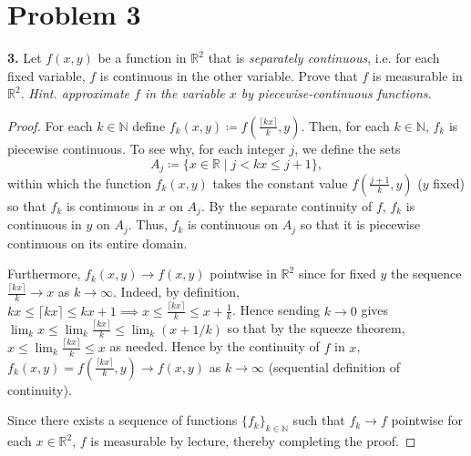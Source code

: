 \section*{Problem 3}
\noindent \textbf{3.} Let \( f(x,y) \) be a function in \( \mathbb{R}^{2}  \) that is \emph{separately continuous}, i.e. for each fixed variable, \( f \) is continuous in the other variable. Prove that \( f \) is measurable in \( \mathbb{R}^{2}  \). \emph{Hint. approximate \( f \) in the variable \( x \) by piecewise-continuous functions.}
\begin{proof}
For each \( k \in \mathbb{N}  \) define \( f_k(x,y) \coloneqq f\left(\frac{\lceil kx \rceil}{k}, y \right)\). Then, for each \( k \in \mathbb{N} \), \( f_k \) is piecewise continuous. To see why, for each integer \( j \), we define the sets
\[ A_j \coloneqq \{ x \in \mathbb{R} \mid j < kx \leq j+1 \}, \]
within which the function \( f_k(x,y) \) takes the constant value \( f\left(\frac{j+1}{k}, y\right) \) (\( y \) fixed) so that \( f_k \) is continuous in \( x \) on \( A_j \). By the separate continuity of \( f \), \( f_k \) is continuous in \( y \) on \( A_j \). Thus, \( f _k\) is continuous on \( A_j \) so that it is piecewise continuous on its entire domain.

	Furthermore, \( f_k(x,y) \to f(x,y) \) pointwise in \( \mathbb{R}^{2}  \) since for fixed \( y \) the sequence \(\frac{\lceil kx \rceil}{k} \to x\) as \( k \to \infty\). Indeed, by definition, \( kx \leq \lceil kx \rceil \leq kx + 1 \implies x \leq \frac{\lceil kx \rceil}{k} \leq x + \frac{1}{k}  \). Hence sending \( k \to 0 \) gives \( \lim_k x \leq  \lim_k\frac{\lceil kx \rceil}{k} \leq \lim_k (x+1/k) \) so that by the squeeze theorem, \( x\leq \lim_k  \frac{\lceil kx \rceil}{k} \leq x \) as needed. Hence by the continuity of \( f \) in \( x \), \( f_k(x,y) = f\left(\frac{\lceil kx \rceil}{k}, y \right)\to f(x,y) \) as \( k \to \infty \) (sequential definition of continuity).

	Since there exists a sequence of functions \( \{f_k\}_{k \in \mathbb{N} }  \) such that \( f_k \to f \) pointwise for each \( x \in \mathbb{R}^{2}  \), \( f \) is measurable by lecture, thereby completing the proof.
\end{proof}
